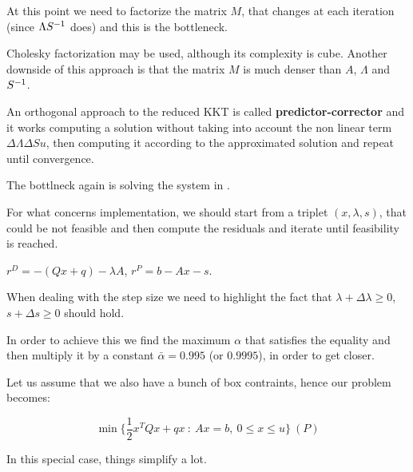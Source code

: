 \documentclass[ComputationalMathematics.tex]{subfiles}
\begin{document}
At this point we need to factorize the matrix $M$, that changes at each iteration (since $\Lambda {S}^{-1}$ does) and this is the bottleneck.

Cholesky factorization may be used, although its complexity is cube. Another downside of this approach is that the matrix $M$ is much denser than $A$, $\Lambda$ and ${S}^{-1}$.

An orthogonal approach to the reduced KKT is called \textbf{predictor-corrector} and it works computing a solution without taking into account the non linear term $\Delta \Lambda \Delta S u$, then computing it according to the approximated solution and repeat until convergence.

The bottlneck again is solving the system in .

For what concerns implementation, we should start from a triplet $(x, \lambda, s)$, that could be not feasible and then compute the residuals and iterate until feasibility is reached.

$r^D = - ( Q x + q ) - \lambda A$, $r^P = b - A x - s$.

When dealing with the step size we need to highlight the fact that $\lambda + \Delta \lambda \geq 0$, $s + \Delta s \geq 0$ should hold.

In order to achieve this we find the maximum $\alpha$ that satisfies the equality and then multiply it by a constant $\bar{\alpha}=0.995$ (or $0.9995$), in order to get closer.

Let us assume that we also have a bunch of box contraints, hence our problem becomes:

\[
  \min \bigg \{\frac{1}{2} x^T Q x + q x~:~Ax = b,~0 \leq x \leq u \bigg \}~(P)
\]

In this special case, things simplify a lot.
  
\end{document}
